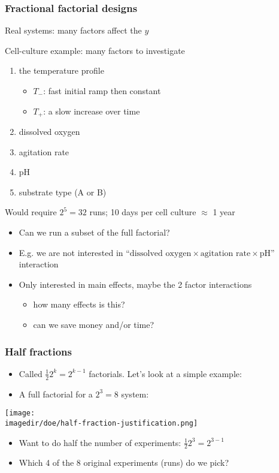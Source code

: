 \begin{frame}\frametitle{Fractional factorial designs}

	Real systems: many factors affect the $y$

	Cell-culture example: many factors to investigate
	\begin{enumerate}
		\item	the temperature profile
		\begin{itemize}
			\item	$T_{-}$: fast initial ramp then constant
			\item	$T_{+}$: a slow increase over time
		\end{itemize}
		\item	dissolved oxygen
		\item	agitation rate
		\item	pH
		\item	substrate type (A or B)
	\end{enumerate}

	Would require $2^5 = 32$ runs; 10 days per cell culture $\approx$ 1 year
	\begin{itemize}
		\item	Can we run a subset of the full factorial?
		\item	E.g. we are not interested in ``$\text{dissolved oxygen} \times \text{agitation rate} \times \text{pH}$'' interaction
		\item	Only interested in main effects, maybe the 2 factor interactions
		\begin{itemize}
			\item	how many effects is this?
			\item	can we save money and/or time?
		\end{itemize}
	\end{itemize}
\end{frame}

\begin{frame}\frametitle{Half fractions}
	\begin{itemize}
		\item	Called $\tfrac{1}{2}2^k = 2^{k-1}$ factorials. Let's look at a simple example:
		\item	A full factorial for a $2^3 = 8$ system:
	\end{itemize}
	\begin{center}
		\texttt{[image: \\imagedir/doe/half-fraction-justification.png]}
	\end{center}
	\begin{itemize}
		\item	Want to do half the number of experiments: $\tfrac{1}{2}2^3 = 2^{3-1}$
		\item	Which 4 of the 8 original experiments (runs) do we pick?
	\end{itemize}
\end{frame}

